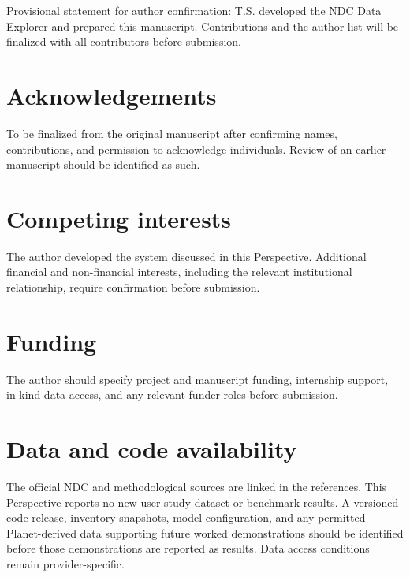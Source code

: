 \documentclass[11pt]{article}
\begin{document}
Provisional statement for author confirmation: T.S. developed the NDC Data Explorer and prepared this manuscript. Contributions and the author list will be finalized with all contributors before submission.

\section*{Acknowledgements}

To be finalized from the original manuscript after confirming names, contributions, and permission to acknowledge individuals. Review of an earlier manuscript should be identified as such.

\section*{Competing interests}

The author developed the system discussed in this Perspective. Additional financial and non-financial interests, including the relevant institutional relationship, require confirmation before submission.

\section*{Funding}

The author should specify project and manuscript funding, internship support, in-kind data access, and any relevant funder roles before submission.

\section*{Data and code availability}

The official NDC and methodological sources are linked in the references. This Perspective reports no new user-study dataset or benchmark results. A versioned code release, inventory snapshots, model configuration, and any permitted Planet-derived data supporting future worked demonstrations should be identified before those demonstrations are reported as results. Data access conditions remain provider-specific.
\end{document}
